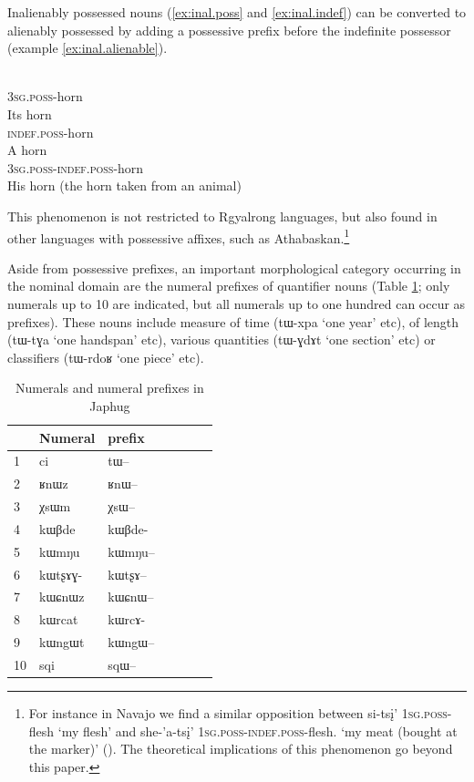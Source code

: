 \documentclass[oldfontcommands,oneside,a4paper,11pt]{article}
\newcommand{\ipa}[1]{{\phon \mbox{#1}}} %
\begin{document}
Inalienably possessed nouns (\ref{ex:inal.poss} and \ref{ex:inal.indef}) can be converted to alienably possessed by adding a possessive prefix before the indefinite possessor (example \ref{ex:inal.alienable}).

\begin{exe}
\ex \label{ex:inal.poss}
\gll \ipa{ɯ-ʁrɯ} \\
3\textsc{sg.poss}-horn \\
\glt Its horn
\ex \label{ex:inal.indef}
\gll \ipa{ta-ʁrɯ} \\
\textsc{indef.poss}-horn \\
\glt A horn
\ex \label{ex:inal.alienable}
\gll \ipa{ɯ-ta-ʁrɯ} \\
3\textsc{sg.poss}-\textsc{indef.poss}-horn \\
\glt His horn (the horn taken from an animal)
\end{exe}
            
This phenomenon is not restricted to Rgyalrong languages, but also found in other languages with possessive affixes, such as Athabaskan.\footnote{For instance in Navajo we find a similar opposition between  \ipa{si-tsį'} \textsc{1sg.poss}-flesh `my flesh' and \ipa{she-'a-tsį'} \textsc{1sg.poss}-\textsc{indef.poss}-flesh. `my meat (bought at the marker)' (\citealt[10]{ym87navajo}). The theoretical implications of this phenomenon go beyond this paper.}       
            
Aside from possessive prefixes, an important morphological category occurring in the nominal domain are the numeral prefixes of quantifier nouns (Table \ref{tab:numeral}; only numerals up to 10 are indicated, but all numerals up to one hundred can occur as prefixes). These nouns include measure of time (\ipa{tɯ-xpa} `one year' etc), of length (\ipa{tɯ-tɣa} `one handspan' etc), various quantities (\ipa{tɯ-ɣdɤt} `one section' etc) or classifiers (\ipa{tɯ-rdoʁ} `one piece' etc). 


\begin{table}[H]
\caption{Numerals and numeral prefixes in Japhug} \label{tab:numeral}  \centering
\begin{tabular}{lllllll}
\toprule
&Numeral & prefix \\
\midrule
1 &\ipa{ci} &\ipa{tɯ--} \\
2 &\ipa{ʁnɯz} &\ipa{ʁnɯ--} \\
3 &\ipa{χsɯm} &\ipa{χsɯ--} \\
4 &\ipa{kɯβde} &\ipa{kɯβde-} \\
5 &\ipa{kɯmŋu} &\ipa{kɯmŋu--} \\
6 &\ipa{kɯtʂɤɣ-} &\ipa{kɯtʂɤ--} \\
7 &\ipa{kɯɕnɯz} &\ipa{kɯɕnɯ--} \\
8 &\ipa{kɯrcat} &\ipa{kɯrcɤ-} \\
9 &\ipa{kɯngɯt} &\ipa{kɯngɯ--} \\
10 &\ipa{sqi} &\ipa{sqɯ--} \\
\bottomrule
\end{tabular}
\end{table}
\end{document}
